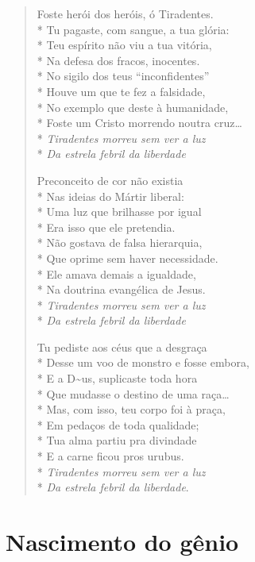 \begin{verse}
Foste herói dos heróis, ó Tiradentes.\\*
Tu pagaste, com sangue, a tua glória:\\*
Teu espírito não viu a tua vitória,\\*
Na defesa dos fracos, inocentes.\\*
No sigilo dos teus “inconfidentes”\\*
Houve um que te fez a falsidade,\\*
No exemplo que deste à humanidade,\\*
Foste um Cristo morrendo noutra cruz\ldots{}\\*
\textit{Tiradentes morreu sem ver a luz}\\*
\textit{Da estrela febril da liberdade}

Preconceito de cor não existia\\*
Nas ideias do Mártir liberal:\\*
Uma luz que brilhasse por igual\\*
Era isso que ele pretendia.\\*
Não gostava de falsa hierarquia,\\*
Que oprime sem haver necessidade.\\*
Ele amava demais a igualdade,\\*
Na doutrina evangélica de Jesus.\\*
\textit{Tiradentes morreu sem ver a luz}\\*
\textit{Da estrela febril da liberdade}

Tu pediste aos céus que a desgraça\\*
Desse um voo de monstro e fosse embora,\\*
E a D\~{}us, suplicaste toda hora\\*
Que mudasse o destino de uma raça\ldots{}\\*
Mas, com isso, teu corpo foi à praça,\\*
Em pedaços de toda qualidade;\\*
Tua alma partiu pra divindade\\*
E a carne ficou pros urubus.\\*
\textit{Tiradentes morreu sem ver a luz}\\*
\textit{Da estrela febril da liberdade}.
\end{verse}


\chapter{Nascimento do gênio}

